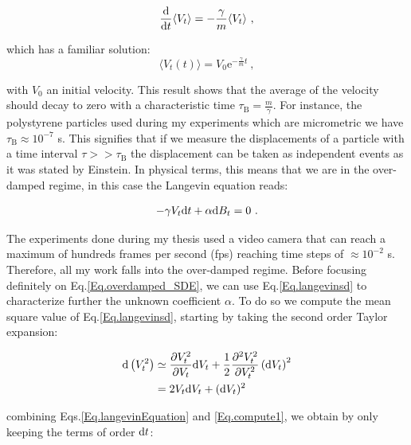 \begin{equation}
	\frac{ \textnormal{d}}{\textnormal{d}t}\langle V_t \rangle = - \frac{\gamma}{m} \langle V_t \rangle ~,
\end{equation}

which has a familiar solution:
\begin{equation}
	\langle V_t (t) \rangle =   V_0 \mathrm{e}^{-\frac{\gamma}{m} t}~,
	\label{Eq.int_V_langevin}
\end{equation}

with $V_0$ an initial velocity. This result shows that the average of the velocity should decay to zero with a characteristic time $\tau_\mathrm{B} = \frac{m}{\gamma}$. For instance, the polystyrene particles used during my experiments which are micrometric we have $\tau_\mathrm{B} \approx 10^{-7}$ s. This signifies that if we measure the displacements of a particle with a time interval $ \tau  >> \tau _\mathrm{B} $ the displacement can be taken as independent events as it was stated by Einstein. In physical terms, this means that we are in the over-damped regime, in this case the Langevin equation reads:

\begin{equation}
	-\gamma V_t \textnormal{d}t  + \alpha  \textnormal{d}B_t = 0~.
	\label{Eq.overdamped_SDE}
\end{equation}

The experiments done during my thesis used a video camera that can reach a maximum of hundreds frames per second (\gls{fps}) reaching time steps of $\approx 10^{-2}$ s. Therefore, all my work falls into the over-damped regime. Before focusing definitely on Eq.\ref{Eq.overdamped_SDE}, we can use Eq.\ref{Eq.langevinsd} to characterize further the unknown coefficient $\alpha$. To do so we compute the mean square value of Eq.\ref{Eq.langevinsd}, starting by taking the second order Taylor expansion:


\begin{equation}
	\begin{aligned}
		\textnormal{d}\left(V_t^2\right) &\simeq \frac{\partial V_t ^ 2}{\partial V_t} \textnormal{d} V_t + \frac{1}{2} \frac{\partial ^2 V_t^2}{\partial V_t ^2} \left( \textnormal{d}V_t \right)^2  \\
		& = 2 V_t \textnormal{d}V_t + (\textnormal{d}V_t)^2 \\ 
	\end{aligned}
	\label{Eq.compute1}
\end{equation}

combining Eqs.\ref{Eq.langevinEquation} and \ref{Eq.compute1}, we obtain by only keeping  the terms of order $\textnormal{d}t$:

